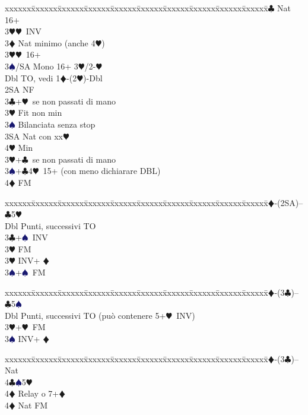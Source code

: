 \documentclass[a4paper,italian]{article}
\newcommand{\BC}{\textcolor{OliveGreen}{$\clubsuit$}}
\newcommand{\BD}{\textcolor{RedOrange}{$\vardiamondsuit$}}
\newcommand{\BH}{\textcolor{Red2}{$\varheartsuit${}}}
\newcommand{\BS}{\textcolor{MidnightBlue}{$\spadesuit${}}}
\newenvironment{bidtable}
{\begin{tabbing}

    xxxxxx\=xxxxxx\=xxxxxx\=xxxxxx\=xxxxxx\=xxxxxx\=xxxxxx\=xxxxxx\=xxxxxx\=xxxxxx\=\kill}
{\end{tabbing} }%
\begin{document}
\begin{multicols}{2}
\begin{bidtable}
        3\BC\> Nat 16+\+\\
        3\BH{}\BH\ INV\-\\
        3\BD\> Nat minimo (anche 4\BH)\\
        3\BH{}\BH\ 16+\\
        3\BS/SA\> Mono 16+ 3\BH/2-\BH\-\-\-\\
        Dbl \> TO, vedi 1\BD-(2\BH)-Dbl\\
        2SA \> NF\\
        3\BC {}+\BH\ se non passati di mano\+\\
        3\BH \> Fit non min\\
        3\BS \> Bilanciata senza stop\\
        3SA \> Nat con xx\BH \\
        4\BH \> Min\-\\
        3\BH {}+\BC\ se non passati di mano\\
        3\BS {}+\BC 4\BH\ 15+ (con meno dichiarare DBL)\\
        4\BD \> FM\-
    \end{bidtable}

    \columnbreak

    \begin{bidtable}
        1\BD-(2SA)-- \> \BC 5\BH \+\\
        Dbl \> Punti, successivi TO\\
        3\BC {}+\BS\ INV\+\\
        3\BH \> FM\-\\
        3\BH \> INV+ \BD \\
        3\BS {}+\BS\ FM\-
    \end{bidtable}
    \begin{bidtable}
        1\BD-(3\BC)-- \> \BC 5\BS \+\\
        Dbl \> Punti, successivi TO (può contenere 5+\BH\ INV)\\
        3\BH {}+\BH\ FM\\
        3\BS \> INV+ \BD \-
    \end{bidtable}
    \begin{bidtable}
        1\BD-(3\BC)-- \> \> Nat\+\\
        4\BC {}\BS 5\BH \+\\
        4\BD \> Relay o 7+\BD \-\\
        4\BD \> Nat FM\-
    \end{bidtable}


\end{multicols}
\end{document}
